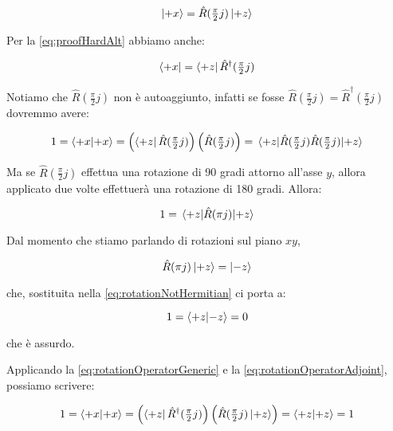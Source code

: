 	\begin{equation} \label{eq:rotationOperatorGeneric}
		\ket{+x} = \hat{R}(\tfrac{\pi}{2} j) \ket{+z}
	\end{equation} 

Per la \eqref{eq:proofHardAlt} abbiamo anche:

	\begin{equation} \label{eq:rotationOperatorAdjoint}
		\bra{+x} = \bra{+z} \hat{R}^\dagger(\tfrac{\pi}{2} j)
	\end{equation}

	Notiamo che $ \hat{R}( \tfrac{\pi}{2} j) $ non \`e autoaggiunto, infatti se fosse $ \hat{R}(\tfrac{\pi}{2} j) = \hat{R}^\dagger(\tfrac{\pi}{2} j)$ dovremmo avere:
	
	\begin{equation}
	 	1 = \braket{+x}{+x} = \left( \bra{+z} \hat{R}(\tfrac{\pi}{2} j) \right ) \left (\hat{R}(\tfrac{\pi}{2} j) \right ) = \mel{+z}{\hat{R}(\tfrac{\pi}{2} j)\hat{R}(\tfrac{\pi}{2} j) }{+z} 
	\end{equation} 

Ma se $ \hat{R}(\tfrac{\pi}{2} j )$ effettua una rotazione di 90 gradi attorno all'asse $y$, allora applicato due volte effettuer\`a una rotazione di 180 gradi. Allora:

	\begin{equation} \label{eq:rotationNotHermitian}
		1 = \mel{+z}{\hat{R}(\pi j ) }{+z}
	\end{equation}

Dal momento che stiamo parlando di rotazioni sul piano $xy$,

	\begin{equation}
		\hat{R}(\pi j ) \ket{+z} = \ket{-z}
	\end{equation}

che, sostituita nella \eqref{eq:rotationNotHermitian} ci porta a:

	\begin{equation}
		1 = \braket{+z}{-z} = 0
	\end{equation}

che \`e assurdo.

Applicando la \eqref{eq:rotationOperatorGeneric} e la \eqref{eq:rotationOperatorAdjoint}, possiamo scrivere:

	\begin{equation}
		1 = \braket{+x}{+x} = \left ( \bra{+z} \hat{R}^\dagger(\tfrac{\pi}{2} j) \right ) \left ( \hat{R}(\tfrac{\pi}{2} j) \ket{+z} \right ) = \braket{+z}{+z} = 1
	\end{equation}

